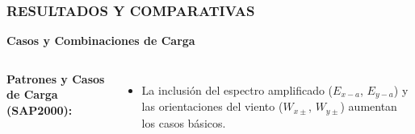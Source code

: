 \documentclass[11.5pt,aspectratio=169,handout]{beamer}
\newcommand{\ctitle}[1]{\frametitle{#1}}
\begin{document}
\begin{frame}
\ctitle{RESULTADOS Y COMPARATIVAS}
\vspace{-4mm}
\begin{center}
  \textcolor{azulUSACH}{\textbf{Casos y Combinaciones de Carga}}
\end{center}
\vspace{1mm}
\begin{columns}[T,totalwidth=\textwidth]
  \vspace{-1mm}
  {\footnotesize\textbf{Patrones y Casos de Carga (SAP2000):}}\\[2mm]
  \\[3mm]
  \begin{itemize}\scriptsize\setlength{\itemsep}{2mm}
    \item La inclusión del \alert{espectro amplificado} ($E_{x-a}$, $E_{y-a}$) y las orientaciones del viento ($W_{x\pm}$, $W_{y\pm}$) aumentan los casos básicos.
  \end{itemize}


\end{columns}
\end{frame}
\end{document}
